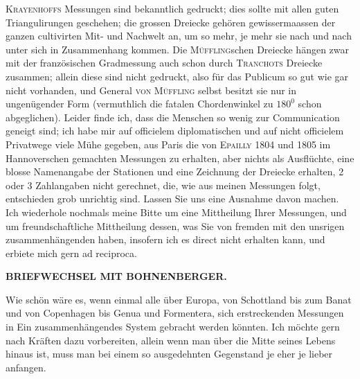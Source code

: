 \textsc{Krayenhoffs} Messungen sind bekanntlich gedruckt; dies sollte mit allen guten Triangulirungen geschehen; die grossen Dreiecke gehören gewissermaassen der ganzen cultivirten Mit- und Nachwelt an, um so mehr, je mehr sie nach und nach unter sich in Zusammenhang kommen.
Die \textsc{Müffling}schen Dreiecke hängen zwar mit der französischen Gradmessung auch schon durch \textsc{Tranchots} Dreiecke zusammen; allein diese sind nicht gedruckt, also für das Publicum so gut wie gar nicht vorhanden, und General \textsc{von Müffling} selbst besitzt sie nur in ungenügender Form (vermuthlich die fatalen Chordenwinkel zu \(180^{0}\) schon abgeglichen).
Leider finde ich, dass die Menschen so wenig zur Communication geneigt sind; ich habe mir auf officielem diplomatischen und auf nicht officielem Privatwege viele Mühe gegeben, aus Paris die von \textsc{Epailly} 1804 und 1805 im Hannoverschen gemachten Messungen zu erhalten, aber nichts als Ausflüchte, eine blosse Namenangabe der Stationen und eine Zeichnung der Dreiecke erhalten, 2 oder 3 Zahlangaben nicht gerechnet, die, wie aus meinen Messungen folgt, entschieden grob unrichtig sind.
Lassen Sie uns eine Ausnahme davon machen.
Ich wiederhole nochmals meine Bitte um eine Mittheilung Ihrer Messungen, und um freundschaftliche Mittheilung dessen, was Sie von fremden mit den unsrigen zusammenhängenden haben, insofern ich es direct nicht erhalten kann, und erbiete mich gern ad reciproca.
\par\clearpage
\noindent{}\hfill{\small\textbf{BRIEFWECHSEL MIT BOHNENBERGER.}}\hfill\null\par\medskip
\noindent Wie schön wäre es, wenn einmal alle über Europa, von Schottland bis zum Banat und von Copenhagen bis Genua und Formentera, sich erstreckenden Messungen in Ein zusammenhängendes System gebracht werden könnten.
Ich möchte gern nach Kräften dazu vorbereiten, allein wenn man über die Mitte seines Lebens hinaus ist, muss man bei einem so ausgedehnten Gegenstand je eher je lieber anfangen.

